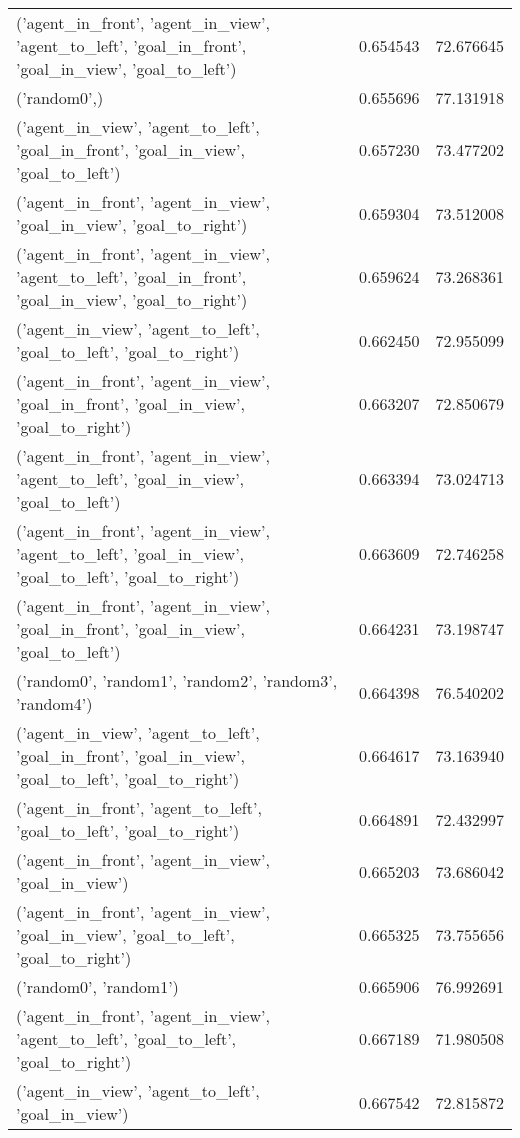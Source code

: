 \begin{tabular}{lrr}
('agent\_in\_front', 'agent\_in\_view', 'agent\_to\_left', 'goal\_in\_front', 'goal\_in\_view', 'goal\_to\_left') & 0.654543 & 72.676645 \\
('random0',) & 0.655696 & 77.131918 \\
('agent\_in\_view', 'agent\_to\_left', 'goal\_in\_front', 'goal\_in\_view', 'goal\_to\_left') & 0.657230 & 73.477202 \\
('agent\_in\_front', 'agent\_in\_view', 'goal\_in\_view', 'goal\_to\_right') & 0.659304 & 73.512008 \\
('agent\_in\_front', 'agent\_in\_view', 'agent\_to\_left', 'goal\_in\_front', 'goal\_in\_view', 'goal\_to\_right') & 0.659624 & 73.268361 \\
('agent\_in\_view', 'agent\_to\_left', 'goal\_to\_left', 'goal\_to\_right') & 0.662450 & 72.955099 \\
('agent\_in\_front', 'agent\_in\_view', 'goal\_in\_front', 'goal\_in\_view', 'goal\_to\_right') & 0.663207 & 72.850679 \\
('agent\_in\_front', 'agent\_in\_view', 'agent\_to\_left', 'goal\_in\_view', 'goal\_to\_left') & 0.663394 & 73.024713 \\
('agent\_in\_front', 'agent\_in\_view', 'agent\_to\_left', 'goal\_in\_view', 'goal\_to\_left', 'goal\_to\_right') & 0.663609 & 72.746258 \\
('agent\_in\_front', 'agent\_in\_view', 'goal\_in\_front', 'goal\_in\_view', 'goal\_to\_left') & 0.664231 & 73.198747 \\
('random0', 'random1', 'random2', 'random3', 'random4') & 0.664398 & 76.540202 \\
('agent\_in\_view', 'agent\_to\_left', 'goal\_in\_front', 'goal\_in\_view', 'goal\_to\_left', 'goal\_to\_right') & 0.664617 & 73.163940 \\
('agent\_in\_front', 'agent\_to\_left', 'goal\_to\_left', 'goal\_to\_right') & 0.664891 & 72.432997 \\
('agent\_in\_front', 'agent\_in\_view', 'goal\_in\_view') & 0.665203 & 73.686042 \\
('agent\_in\_front', 'agent\_in\_view', 'goal\_in\_view', 'goal\_to\_left', 'goal\_to\_right') & 0.665325 & 73.755656 \\
('random0', 'random1') & 0.665906 & 76.992691 \\
('agent\_in\_front', 'agent\_in\_view', 'agent\_to\_left', 'goal\_to\_left', 'goal\_to\_right') & 0.667189 & 71.980508 \\
('agent\_in\_view', 'agent\_to\_left', 'goal\_in\_view') & 0.667542 & 72.815872 \\

\end{tabular}
